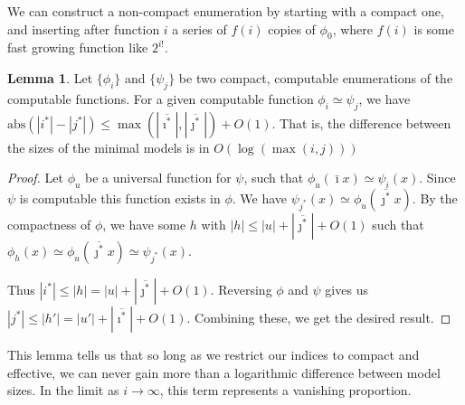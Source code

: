 \documentclass{article}
\theoremstyle{definition}
\newtheorem{lma}{Lemma}
\begin{document}
We can construct a non-compact enumeration by starting with a compact one, and inserting after function $i$ a series of $f(i)$ copies of $\phi_0$, where $f(i)$ is some fast growing function like $2^{i!}$.

\begin{lma}
Let $\{\phi_i\}$ and $\{\psi_j\}$ be two compact, computable enumerations of the computable functions. For a given computable function $\phi_i \simeq \psi_j$,  we have $\mbox{abs}(|i^*| - |j^*|) \leq \max(|\overline{\imath^*}|, |\overline{\jmath^*}|) + O(1)$. That is, the difference between the sizes of the minimal models is in $O(\log(\max(i, j)))$
\end{lma}
\begin{proof}
Let $\phi_u$ be a universal function for $\psi$, such that $\phi_u(\bar{\imath}x) \simeq \psi_i(x)$. Since $\psi$ is computable this function exists in $\phi$. We have $\psi_{j^*}(x) \simeq \phi_u(\overline{\jmath^*}x)$. By the compactness of $\phi$, we have some $h$ with $|h| \leq |u| + |\overline{\jmath^*}| + O(1)$ such that $\phi_{h}(x) \simeq \phi_u(\overline{\jmath^*}x) \simeq \psi_{j^*}(x)$. 

Thus $|i^*| \leq |h| = |u| + |\overline{\jmath^*}| + O(1)$. Reversing $\phi$ and $\psi$ gives us $|j^*| \leq |h'| = |u'| + |\overline{\imath^*}| + O(1)$. Combining these, we get the desired result.
\end{proof}

This lemma tells us that so long as we restrict our indices to compact and effective, we can never gain more than a logarithmic difference between model sizes. In the limit as $i \rightarrow \infty$, this term represents a vanishing proportion.
\end{document}
